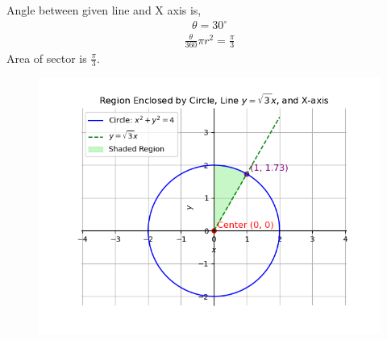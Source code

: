 \documentclass[journal]{IEEEtran}
\begin{document}
Angle between given line and X axis is,\\
\begin{align}
    \theta= 30^\circ
\end{align}
\begin{align}
    \frac{\theta}{360}\pi r^2=\frac{\pi}{3}
\end{align}
Area of sector is $\frac{\pi}{3}$.
\begin{figure}[h!]
   \centering
   \includegraphics[width=\linewidth]{figs/Figure_1.png}
   \caption{}
   \label{Fig_1}
   \label{stemplot}
\end{figure}
\end{document}

